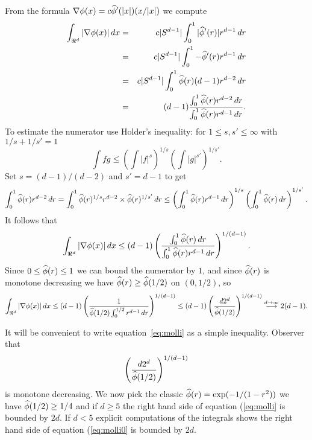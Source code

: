 From the formula $\nabla \phi(x) = c \widehat{\phi}'(|x|) (x/|x|)$ we compute
\begin{eqnarray*}
\int_{\Re^d} |\nabla \phi(x)| \, dx
&=& c |S^{d-1}| \int_0^1 |\widehat{\phi}'(r)| r^{d-1} \, dr \\
&=& c |S^{d-1}| \int_0^1 -\widehat{\phi}'(r) r^{d-1} \, dr \\
&=& c |S^{d-1}| \int_0^1 \widehat{\phi}(r) (d-1) r^{d-2} \, dr \\
&=& (d-1) \frac{\int_0^1 \widehat{\phi}(r) r^{d-2} \, dr}
{\int_0^1 \widehat{\phi}(r) r^{d-1} \, dr}.
\end{eqnarray*}
To estimate the numerator use Holder's inequality: for
$1 \leq s, s' \leq \infty$ with $1/s + 1/s' = 1$ 
$$
\int f g 
\leq \left(\int |f|^s \right)^{1/s} \left(\int |g|^{s'} \right)^{1/s'}.
$$
Set $s = (d-1)/(d-2)$ and $s' = d-1$ to get
$$
\int_0^1 \widehat{\phi}(r) r^{d-2} \, dr
= \int_0^1 \widehat{\phi}(r)^{1/s} r^{d-2} \times \widehat{\phi}(r)^{1/s'}  \, dr
\leq \left(\int_0^1 \widehat{\phi}(r) r^{d-1} \, dr \right)^{1/s}
\left(\int_0^1 \widehat{\phi}(r) \, dr \right)^{1/s'}.
$$
It follows that
\begin{equation}\label{eq:molli0}
\int_{\Re^d} |\nabla \phi(x)| \, dx
\leq (d-1) \left( \frac{\int_0^1 \widehat{\phi}(r) \, dr}
{\int_0^1 \widehat{\phi}(r) r^{d-1} \, dr} \right)^{1/(d-1)}.
\end{equation}
Since $0 \leq \widehat{\phi}(r) \leq 1$ we can bound the numerator
by $1$, and since $\widehat{\phi}(r)$ is monotone decreasing we have
$\widehat{\phi}(r) \geq \widehat{\phi}(1/2)$ on $(0,1/2)$, so 
\begin{equation}\label{eq:molli}
\int_{\Re^d} |\nabla \phi(x)| \, dx
\leq (d-1)
\left( \frac{1}{\widehat{\phi}(1/2) \int_0^{1/2} r^{d-1} \, dr} \right)^{1/(d-1)} 
\leq (d-1) \left( \frac{d 2^d}{\widehat{\phi}(1/2)} \right)^{1/(d-1)}
\stackrel{d \rightarrow \infty}{\longrightarrow} 2(d-1).
\end{equation}

It will be convenient to write equation~\ref{eq:molli} as a simple
inequality. Observer that
\[
 \left( \frac{d 2^d}{\widehat{\phi}(1/2)} \right)^{1/(d-1)}
\]
is monotone decreasing. We now pick the classic
$\widehat{\phi}(r) = \exp(-1/(1-r^2))$ we have $\widehat{\phi}(1/2) \geq 1/4$ and if
$d \geq 5$ the right hand side of equation (\ref{eq:molli} is bounded
by $2d$. If $d < 5$ explicit computations of the integrals shows the
right hand side of equation (\ref{eq:molli0} is bounded by $2d$.






